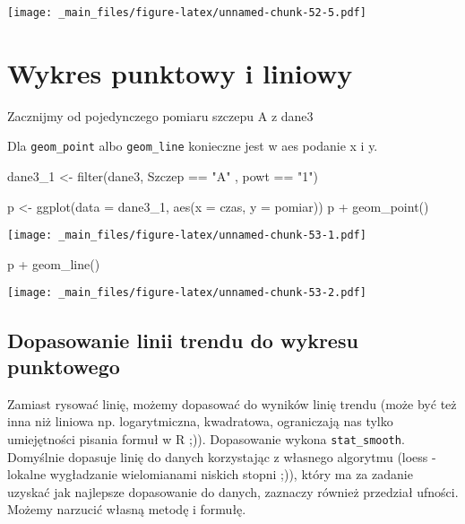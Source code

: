 \documentclass[
]{book}
\newenvironment{Shaded}{\begin{snugshade}}{\end{snugshade}}
\newcommand{\AttributeTok}[1]{\textcolor[rgb]{0.77,0.63,0.00}{#1}}
\newcommand{\FunctionTok}[1]{\textcolor[rgb]{0.00,0.00,0.00}{#1}}
\newcommand{\NormalTok}[1]{#1}
\newcommand{\OtherTok}[1]{\textcolor[rgb]{0.56,0.35,0.01}{#1}}
\newcommand{\SpecialCharTok}[1]{\textcolor[rgb]{0.00,0.00,0.00}{#1}}
\newcommand{\StringTok}[1]{\textcolor[rgb]{0.31,0.60,0.02}{#1}}
\begin{document}
\texttt{[image: \_main\_files/figure-latex/unnamed-chunk-52-5.pdf]}

\hypertarget{wykres-punktowy-i-liniowy}{%
\section{Wykres punktowy i liniowy}\label{wykres-punktowy-i-liniowy}}

Zacznijmy od pojedynczego pomiaru szczepu A z dane3

Dla \texttt{geom\_point} albo \texttt{geom\_line} konieczne jest w aes podanie x i y.

\begin{Shaded}
\begin{Highlighting}[]
\NormalTok{dane3\_1 }\OtherTok{\textless{}{-}} \FunctionTok{filter}\NormalTok{(dane3, Szczep }\SpecialCharTok{==} \StringTok{"A"}\NormalTok{ , powt }\SpecialCharTok{==} \StringTok{"1"}\NormalTok{)}

\NormalTok{p }\OtherTok{\textless{}{-}} \FunctionTok{ggplot}\NormalTok{(}\AttributeTok{data =}\NormalTok{ dane3\_1, }\FunctionTok{aes}\NormalTok{(}\AttributeTok{x =}\NormalTok{ czas, }\AttributeTok{y =}\NormalTok{ pomiar))}
\NormalTok{p }\SpecialCharTok{+} \FunctionTok{geom\_point}\NormalTok{()}
\end{Highlighting}
\end{Shaded}

\texttt{[image: \_main\_files/figure-latex/unnamed-chunk-53-1.pdf]}

\begin{Shaded}
\begin{Highlighting}[]
\NormalTok{p }\SpecialCharTok{+} \FunctionTok{geom\_line}\NormalTok{()}
\end{Highlighting}
\end{Shaded}

\texttt{[image: \_main\_files/figure-latex/unnamed-chunk-53-2.pdf]}

\hypertarget{dopasowanie-linii-trendu-do-wykresu-punktowego}{%
\subsection{Dopasowanie linii trendu do wykresu punktowego}\label{dopasowanie-linii-trendu-do-wykresu-punktowego}}

Zamiast rysować linię, możemy dopasować do wyników linię trendu (może być też inna niż liniowa np. logarytmiczna, kwadratowa, ograniczają nas tylko umiejętności pisania formuł w R ;)). Dopasowanie wykona \texttt{stat\_smooth}. Domyślnie dopasuje linię do danych korzystając z własnego algorytmu (loess - lokalne wygładzanie wielomianami niskich stopni ;)), który ma za zadanie uzyskać jak najlepsze dopasowanie do danych, zaznaczy również przedział ufności. Możemy narzucić własną metodę i formułę.
\end{document}
